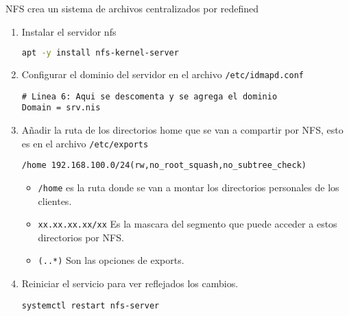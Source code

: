 \documentclass[../main.tex]{subfiles}
\begin{document}
NFS crea un sistema de archivos centralizados por redefined
\begin{enumerate}
\item Instalar el servidor nfs

  \begin{lstlisting}[language=bash]
apt -y install nfs-kernel-server
\end{lstlisting}

\item Configurar el dominio del servidor en el
  archivo \lstinline|/etc/idmapd.conf|

  \begin{lstlisting}
# Linea 6: Aqui se descomenta y se agrega el dominio
Domain = srv.nis
\end{lstlisting}

\item Añadir la ruta de los directorios home que se van a
  compartir por NFS, esto es en el archivo \lstinline|/etc/exports|

  \begin{lstlisting}
/home 192.168.100.0/24(rw,no_root_squash,no_subtree_check) 
\end{lstlisting}

  \begin{itemize}
  \item \lstinline|/home| es la ruta donde se van a montar
    los directorios personales de los clientes.
  \item \lstinline|xx.xx.xx.xx/xx| Es la mascara del segmento que
    puede acceder a estos directorios por NFS.\@
  \item \lstinline|(..*)| Son las opciones de exports.
  \end{itemize}

  
\item Reiniciar el servicio para ver reflejados los cambios.

  \begin{lstlisting}
systemctl restart nfs-server
\end{lstlisting}
  
\end{enumerate}
\end{document}
